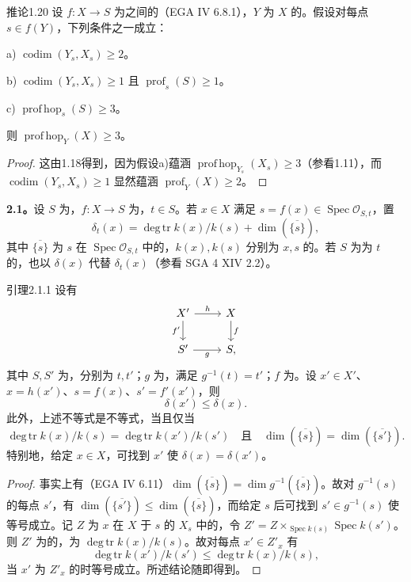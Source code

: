 \begin{SGAresult}{推论}{1.20}
设 $f:X\to S$ 为之间的（EGA IV 6.8.1），$Y$ 为 $X$ 的。假设对每点 $s\in f(Y)$，下列条件之一成立：

a) $\operatorname{codim}(Y_s,X_s)\geq2$。

b) $\operatorname{codim}(Y_s,X_s)\geq1$ 且 $\operatorname{prof}_s(S)\geq1$。

c) $\operatorname{prof\,hop}_s(S)\geq3$。

则 $\operatorname{prof\,hop}_Y(X)\geq3$。
\end{SGAresult}
\begin{proof}
这由1.18得到，因为假设a)蕴涵 $\operatorname{prof\,hop}_{Y_s}(X_s)\geq3$（参看1.11），而 $\operatorname{codim}(Y_s,X_s)\geq1$ 显然蕴涵 $\operatorname{prof}_Y(X)\geq2$。
\end{proof}
\textbf{2.1。}设 $S$ 为，$f:X\to S$ 为，$t\in S$。若 $x\in X$ 满足 $s=f(x)\in\operatorname{Spec}\mathcal O_{S,t}$，置
\[\delta_t(x)=\operatorname{deg\,tr}k(x)/k(s)+\dim(\overline{\{s\}}),\]
其中 $\overline{\{s\}}$ 为 $s$ 在 $\operatorname{Spec}\mathcal O_{S,t}$ 中的，$k(x),k(s)$ 分别为 $x,s$ 的。若 $S$ 为为 $t$ 的，也以 $\delta(x)$ 代替 $\delta_t(x)$（参看 SGA 4 XIV 2.2）。
\begin{SGAresult}{引理}{2.1.1}
设有
\[\begin{tikzcd}X'\arrow[r,"h"]\arrow[d,"f'"']&X\arrow[d,"f"]\\S'\arrow[r,"g"']&S,\end{tikzcd}\]
其中 $S,S'$ 为，分别为 $t,t'$；$g$ 为，满足 $g^{-1}(t)=t'$；$f$ 为。设 $x'\in X'$、$x=h(x')$、$s=f(x)$、$s'=f'(x')$，则
\[\delta(x')\leq\delta(x).\]
此外，上述不等式是不等式，当且仅当
\[\operatorname{deg\,tr}k(x)/k(s)=\operatorname{deg\,tr}k(x')/k(s')\quad\text{且}\quad\dim(\overline{\{s\}})=\dim(\overline{\{s'\}}).\]
特别地，给定 $x\in X$，可找到 $x'$ 使 $\delta(x)=\delta(x')$。
\end{SGAresult}
\begin{proof}
事实上有（EGA IV 6.11）$\dim(\overline{\{s\}})=\dim g^{-1}(\overline{\{s\}})$。故对 $g^{-1}(s)$ 的每点 $s'$，有 $\dim(\overline{\{s'\}})\leq\dim(\overline{\{s\}})$，而给定 $s$ 后可找到 $s'\in g^{-1}(s)$ 使等号成立。记 $Z$ 为 $x$ 在 $X$ 于 $s$ 的 $X_s$ 中的，令 $Z'=Z\times_{\operatorname{Spec}k(s)}\operatorname{Spec}k(s')$。则 $Z'$ 为的，为 $\operatorname{deg\,tr}k(x)/k(s)$。故对每点 $x'\in Z'_x$ 有
\[\operatorname{deg\,tr}k(x')/k(s')\leq\operatorname{deg\,tr}k(x)/k(s),\]
当 $x'$ 为 $Z'_x$ 的时等号成立。所述结论随即得到。
\end{proof}
